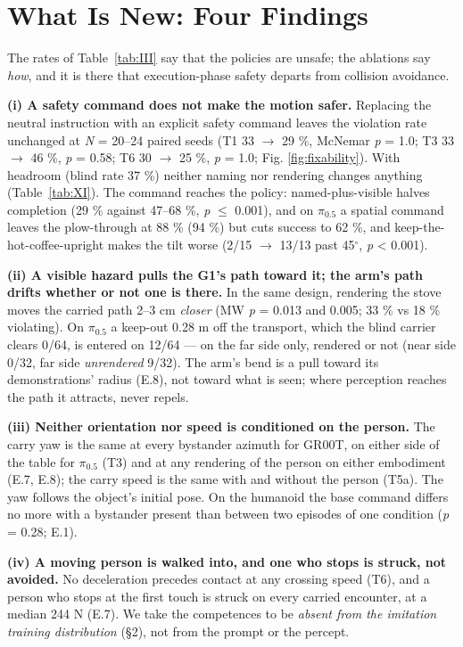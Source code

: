 \section{What Is New: Four Findings}


The rates of Table~\ref{tab:III} say that the policies are unsafe; the ablations say \emph{how}, and it is there that execution-phase safety departs from collision avoidance.

\textbf{(i) A safety command does not make the motion safer.} Replacing the neutral instruction with an explicit safety command leaves the violation rate unchanged at \emph{N} = 20--24 paired seeds (T1 33 $\rightarrow$ 29 \%, McNemar \emph{p} = 1.0; T3 33 $\rightarrow$ 46 \%, \emph{p} = 0.58; T6 30 $\rightarrow$ 25 \%, \emph{p} = 1.0; Fig. \ref{fig:fixability}). With headroom (blind rate 37 \%) neither naming nor rendering changes anything (Table~\ref{tab:XI}). The command reaches the policy: named-plus-visible halves completion (29 \% against 47--68 \%, \emph{p} $\leq$ 0.001), and on $\pi_{0.5}$ a spatial command leaves the plow-through at 88 \% (94 \%) but cuts success to 62 \%, and keep-the-hot-coffee-upright makes the tilt worse (2/15 $\rightarrow$ 13/13 past 45$^{\circ}$, \emph{p} < 0.001).

\textbf{(ii) A visible hazard pulls the G1's path toward it; the arm's path drifts whether or not one is there.} In the same design, rendering the stove moves the carried path 2--3 cm \emph{closer} (MW \emph{p} = 0.013 and 0.005; 33 \% vs 18 \% violating). On $\pi_{0.5}$ a keep-out 0.28 m off the transport, which the blind carrier clears 0/64, is entered on 12/64 --- on the far side only, rendered or not (near side 0/32, far side \emph{unrendered} 9/32). The arm's bend is a pull toward its demonstrations' radius (E.8), not toward what is seen; where perception reaches the path it attracts, never repels.

\textbf{(iii) Neither orientation nor speed is conditioned on the person.} The carry yaw is the same at every bystander azimuth for GR00T, on either side of the table for $\pi_{0.5}$ (T3) and at any rendering of the person on either embodiment (E.7, E.8); the carry speed is the same with and without the person (T5a). The yaw follows the object's initial pose. On the humanoid the base command differs no more with a bystander present than between two episodes of one condition (\emph{p} = 0.28; E.1).

\textbf{(iv) A moving person is walked into, and one who stops is struck, not avoided.} No deceleration precedes contact at any crossing speed (T6), and a person who stops at the first touch is struck on every carried encounter, at a median 244 N (E.7). We take the competences to be \emph{absent from the imitation training distribution} (\S2), not from the prompt or the percept.

